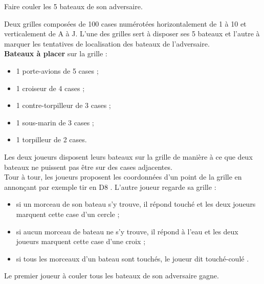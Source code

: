    \begin{minipage}{5.5cm}  
       Faire couler les 5 bateaux de son adversaire.

      \partie[matériel.] Deux grilles composées de 100 cases numérotées horizontalement de 1 à 10 et verticalement de A à J. L'une des grilles sert à disposer ses 5 bateaux et l’autre à marquer les tentatives de localisation des bateaux de l’adversaire. \\  
      {\bf Bateaux à placer} sur la grille :
      \begin{itemize}
         \item 1 porte-avions de 5 cases ;
         \item 1 croiseur de 4 cases ;
         \item 1 contre-torpilleur de 3 cases ;
         \item 1 sous-marin de 3 cases ;
         \item 1 torpilleur de 2 cases.
      \end{itemize}
   
       Les deux joueurs disposent leurs bateaux sur la grille de manière à ce que deux bateaux ne puissent pas être sur des cases adjacentes. \\
      Tour à tour, les joueurs proposent les coordonnées d'un point de la grille en annonçant par exemple \og tir en D8 \fg. L’autre joueur regarde sa grille :
      \begin{itemize}
         \item si un morceau de son bateau s’y trouve, il répond \og touché \fg{} et les deux joueurs marquent cette case d'un cercle ;
         \item si aucun morceau de bateau ne s’y trouve, il répond \og à l'eau \fg{} et les deux joueurs marquent cette case d'une croix ;
         \item si tous les morceaux d’un bateau sont touchés, le joueur dit \og touché-coulé \fg.
      \end{itemize}
      Le premier joueur à couler tous les bateaux de son adversaire gagne.
   \end{minipage}
   \quad
